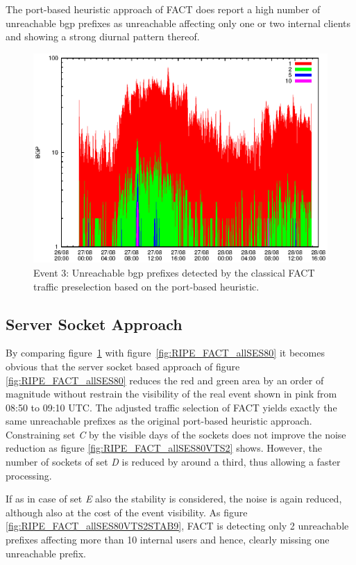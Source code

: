 The port-based heuristic approach of \gls{FACT} does report a high number of 
unreachable \gls{bgp} prefixes as unreachable affecting only one or two internal 
clients and showing a strong diurnal pattern thereof. 

\begin{figure}
	[p] \centering 
	\includegraphics[width=0.75\linewidth]{images/events/2010_08_27/bgp_log_port80_ref.eps} \caption{Event 3: Unreachable \gls{bgp} prefixes detected by the classical \gls{FACT} traffic preselection based on the port-based heuristic.} 
	\label{fig:RIPE_FACT_REF} 
\end{figure}

\subsection{Server Socket Approach} 

By comparing figure \ref{fig:RIPE_FACT_REF} with 
figure \ref{fig:RIPE_FACT_allSES80} it becomes obvious that the \gls{server 
socket} based approach of figure \ref{fig:RIPE_FACT_allSES80} reduces the red 
and green area by an order of magnitude without restrain the visibility of the 
real event shown in pink from 08:50 to 09:10 UTC. The adjusted traffic selection 
of \gls{FACT} yields exactly the same unreachable prefixes as the original 
port-based heuristic approach. Constraining set \emph{C} by the visible days of 
the sockets does not improve the noise reduction as figure 
\ref{fig:RIPE_FACT_allSES80VTS2} shows. However, the number of sockets of set 
\emph{D} is reduced by around a third, thus allowing a faster processing.

If as in case of set \emph{E} also the stability is considered, the noise is 
again reduced, although also at the cost of the event visibility. As figure 
\ref{fig:RIPE_FACT_allSES80VTS2STAB9}, \gls{FACT} is detecting only 2 
unreachable prefixes affecting more than 10 internal users and hence, clearly 
missing one unreachable prefix. 

